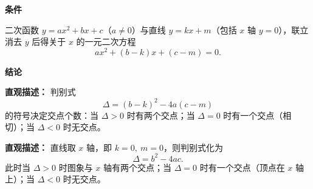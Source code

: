 \begin{statementbox}
	\textbf{\textcolor{CStatement}{条件}}
	\begin{description}[style=nextline, leftmargin=2.8em, labelsep=0.5em, itemsep=0.35em]
		\item[\textbf{\textcolor{CStatement}{条件 1（函数形式）：}}]
		      二次函数 $y=ax^{2}+bx+c$（$a\neq0$）与直线 $y=kx+m$（包括 $x$ 轴 $y=0$），联立消去 $y$ 后得关于 $x$ 的一元二次方程
		      \[
			      ax^{2}+(b-k)x+(c-m)=0.
		      \]
	\end{description}

	\textbf{\textcolor{CStatement}{结论}}
	\begin{description}[style=nextline, leftmargin=2.8em, labelsep=0.5em, itemsep=0.45em]
		\item[\textbf{\textcolor{CStatement}{结论一（交点判别）：}}]
		      \textbf{\textcolor{CStatement}{直观描述：}}
		      判别式
		      \[
			      \Delta=(b-k)^{2}-4a(c-m)
		      \]
		      的符号决定交点个数：当 $\Delta>0$ 时有两个交点；当 $\Delta=0$ 时有一个交点（相切）；当 $\Delta<0$ 时无交点。

		\item[\textbf{\textcolor{CStatement}{常见变形（横轴特例）：}}]
		      \textbf{\textcolor{CStatement}{直观描述：}}
		      直线取 $x$ 轴，即 $k=0,\ m=0$，则判别式化为
		      \[
			      \Delta=b^{2}-4ac.
		      \]
		      此时当 $\Delta>0$ 时图象与 $x$ 轴有两个交点；当 $\Delta=0$ 时有一个交点（顶点在 $x$ 轴上）；当 $\Delta<0$ 时无交点。
	\end{description}
\end{statementbox}
